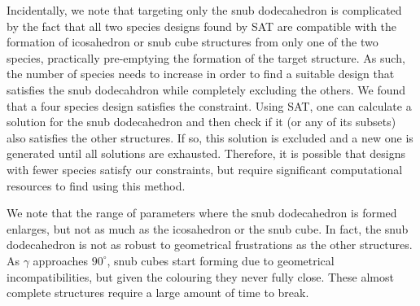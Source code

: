 \documentclass[a4paper, amsfonts, amssymb, amsmath, reprint, showkeys, nofootinbib, oneside]{revtex4-1}
\begin{document}
Incidentally, we note that targeting only the snub dodecahedron is complicated by the fact that all two species designs found by SAT are compatible with the formation of icosahedron or snub cube structures from only one of the two species, practically pre-emptying the formation of the target structure. As such, the number of species needs to increase in order to find a suitable design that satisfies the snub dodecahdron while completely excluding the others. We found that a four species design satisfies the constraint. Using SAT, one can calculate a solution for the snub dodecahedron and then check if it (or any of its subsets) also satisfies the other structures. If so, this solution is excluded and a new one is generated until all solutions are exhausted. Therefore, it is possible that designs with fewer species satisfy our constraints, but require significant computational resources to find using this method.

We note that the range of parameters where the snub dodecahedron is formed enlarges, but not as much as the icosahedron or the snub cube. In fact, the snub dodecahedron is not as robust to geometrical frustrations as the other structures. As $\gamma$ approaches $90^\circ$, snub cubes start forming due to geometrical incompatibilities, but given the colouring they never fully close. These almost complete structures require a large amount of time to break.

\end{document}
